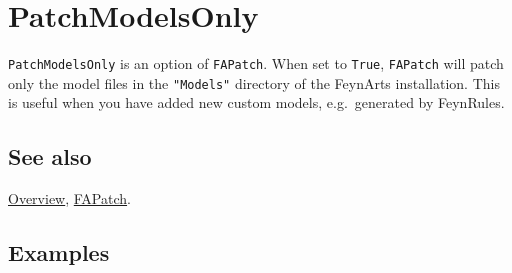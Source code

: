 \documentclass[../FeynCalcManual.tex]{subfiles}
\begin{document}
\hypertarget{patchmodelsonly}{
\section{PatchModelsOnly}\label{patchmodelsonly}}

\texttt{PatchModelsOnly} is an option of \texttt{FAPatch}. When set to
\texttt{True}, \texttt{FAPatch} will patch only the model files in the
\texttt{"Models"} directory of the FeynArts installation. This is useful
when you have added new custom models, e.g.~generated by FeynRules.

\subsection{See also}

\hyperlink{toc}{Overview}, \hyperlink{fapatch}{FAPatch}.

\subsection{Examples}
\end{document}
